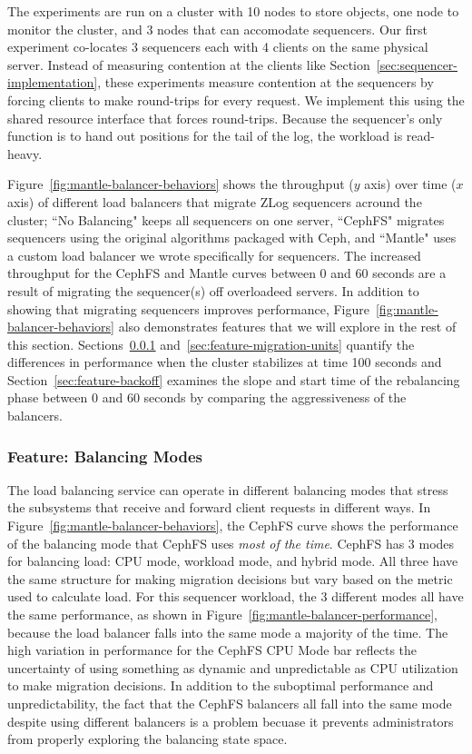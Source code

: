 \documentclass[preprint]{sigplanconf-eurosys}
\begin{document}
The experiments are run on a cluster with 10 nodes to store objects, one node
to monitor the cluster, and 3 nodes that can accomodate sequencers. Our first
experiment co-locates 3 sequencers each with 4 clients on the same physical
server.  Instead of measuring contention at the clients like
Section~\ref{sec:sequencer-implementation}, these experiments measure
contention at the sequencers by forcing clients to make round-trips for every
request. We implement this using the shared resource interface that forces
round-trips.  Because the sequencer's only function is to  hand out positions
for the tail of the log, the workload is read-heavy.

Figure~\ref{fig:mantle-balancer-behaviors} shows the throughput (\(y\) axis)
over time (\(x\) axis) of different load balancers that migrate ZLog sequencers
acround the cluster; ``No Balancing" keeps all sequencers on one server,
``CephFS" migrates sequencers using the original algorithms packaged with Ceph,
and ``Mantle" uses a custom load balancer we wrote specifically for
sequencers. The increased throughput for the CephFS and Mantle curves between 0
and 60 seconds are a result of migrating the sequencer(s) off overloadeed
servers. In addition to showing that migrating sequencers improves performance,
Figure~\ref{fig:mantle-balancer-behaviors} also demonstrates features that we
will explore in the rest of this section.
Sections~\ref{sec:feature-balancing-modes}
and~\ref{sec:feature-migration-units} quantify the differences in performance
when the cluster stabilizes at time 100 seconds and
Section~\ref{sec:feature-backoff} examines the slope and start time of the
rebalancing phase between 0 and 60 seconds by comparing the aggressiveness of
the balancers.

\subsubsection{Feature: Balancing Modes}
\label{sec:feature-balancing-modes}

The load balancing service can operate in different balancing modes that stress
the subsystems that receive and forward client requests in different ways. In
Figure~\ref{fig:mantle-balancer-behaviors}, the CephFS curve shows the
performance of the balancing mode that CephFS uses {\it most of the time}.
CephFS has 3 modes for balancing load: CPU mode, workload mode, and hybrid
mode. All three have the same structure for making migration decisions but vary
based on the metric used to calculate load. For this sequencer workload, the 3
different modes all have the same performance, as shown in
Figure~\ref{fig:mantle-balancer-performance}, because the load balancer falls
into the same mode a majority of the time.  The high variation in performance
for the CephFS CPU Mode bar reflects the uncertainty of using something as
dynamic and unpredictable as CPU utilization to make migration decisions. In
addition to the suboptimal performance and unpredictability, the fact that the
CephFS balancers all fall into the same mode despite using different balancers
is a problem becuase it prevents administrators from properly exploring the
balancing state space.
\end{document}
